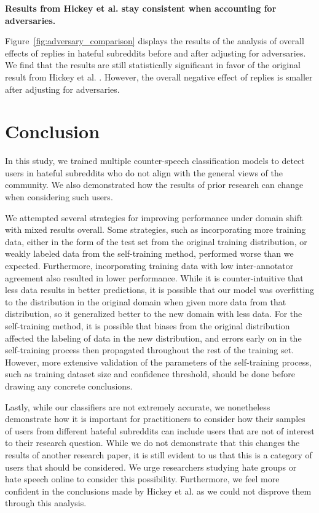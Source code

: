 \documentclass[10pt,twocolumn,letterpaper]{article}
\begin{document}
\textbf{Results from Hickey et al. stay consistent when accounting for adversaries.}

Figure~\ref{fig:adversary_comparison} displays the results of the analysis of overall effects of replies in hateful subreddits before and after adjusting for adversaries. We find that the results are still statistically significant in favor of the original result from Hickey et al. \cite{hickey2023reddit}. However, the overall negative effect of replies is smaller after adjusting for adversaries.


\section{Conclusion}
In this study, we trained multiple counter-speech classification models to detect users in hateful subreddits who do not align with the general views of the community. We also demonstrated how the results of prior research can change when considering such users.

We attempted several strategies for improving performance under domain shift with mixed results overall. Some strategies, such as incorporating more training data, either in the form of the test set from the original training distribution, or weakly labeled data from the self-training method, performed worse than we expected. Furthermore, incorporating training data with low inter-annotator agreement also resulted in lower performance. While it is counter-intuitive that less data results in better predictions, it is possible that our model was overfitting to the distribution in the original domain when given more data from that distribution, so it generalized better to the new domain with less data. For the self-training method, it is possible that biases from the original distribution affected the labeling of data in the new distribution, and errors early on in the self-training process then propagated throughout the rest of the training set. However, more extensive validation of the parameters of the self-training process, such as training dataset size and confidence threshold, should be done before drawing any concrete conclusions. 

Lastly, while our classifiers are not extremely accurate, we nonetheless demonstrate how it is important for practitioners to consider how their samples of users from different hateful subreddits can include users that are not of interest to their research question. While we do not demonstrate that this changes the results of another research paper, it is still evident to us that this is a category of users that should be considered. We urge researchers studying hate groups or hate speech online to consider this possibility. Furthermore, we feel more confident in the conclusions made by Hickey et al. as we could not disprove them through this analysis.
\end{document}
